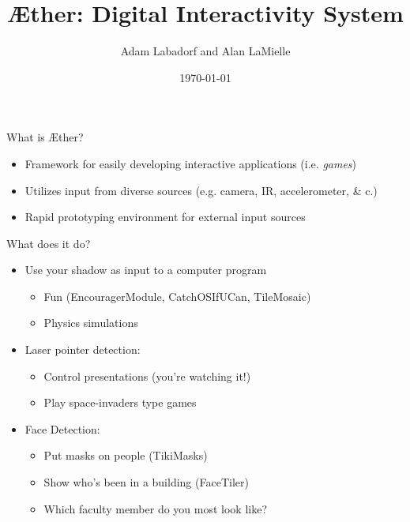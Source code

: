 \documentclass{beamer}
\begin{document}
\title[]
{{\AE}ther: Digital Interactivity System}


\date {\today}

\author[Colorado State University]
{Adam Labadorf and Alan LaMielle} %

\begin{frame}
    \titlepage
\end{frame}

\begin{frame}{What is {\AE}ther?}

\begin{itemize}
\item Framework for easily developing interactive applications (i.e. {\it games})
\item Utilizes input from diverse sources (e.g. camera, IR, accelerometer, \& c.)
\item Rapid prototyping environment for external input sources
\end{itemize}

\end{frame}



\begin{frame}{What does it do?}

\begin{itemize}

\item Use your shadow as input to a computer program 
\begin{itemize}
\item Fun (EncouragerModule, CatchOSIfUCan, TileMosaic)
\item Physics simulations
\end{itemize}

\item Laser pointer detection:
\begin{itemize}
\item Control presentations (you're watching it!)
\item Play space-invaders type games
\end{itemize}

\item Face Detection:
\begin{itemize}
\item Put masks on people (TikiMasks)
\item Show who's been in a building (FaceTiler)
\item Which faculty member do you most look like?
\end{itemize}

\end{itemize}

\end{frame}
\end{document}
